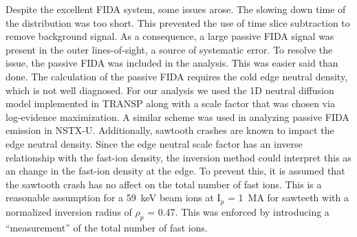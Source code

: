 Despite the excellent FIDA system, some issues arose. The slowing down time of the distribution was too short. This prevented the use of time slice subtraction to remove background signal. As a consequence, a large passive FIDA signal was present in the outer lines-of-sight, a source of systematic error. To resolve the issue, the passive FIDA was included in the analysis. This was easier said than done. The calculation of the passive FIDA requires the cold edge neutral density, which is not well diagnosed. For our analysis we used the 1D neutral diffusion model implemented in TRANSP along with a scale factor that was chosen via log-evidence maximization. A similar scheme was used in analyzing passive FIDA emission in NSTX-U\cite{hao2018measurement}. Additionally, sawtooth crashes are known to impact the edge neutral density. Since the edge neutral scale factor has an inverse relationship with the fast-ion density, the inversion method could interpret this as an change in the fast-ion density at the edge. To prevent this, it is assumed that the sawtooth crash has no affect on the total number of fast ions. This is a reasonable assumption for a 59~keV beam ions at I$_p$ = 1~MA for sawteeth with a normalized inversion radius of $\rho_p$ = 0.47. This was enforced by introducing a ``measurement'' of the total number of fast ions.

